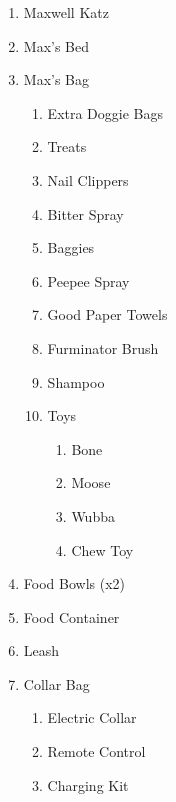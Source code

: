 \documentclass[pdftex,12pt]{article}
\begin{document}
\begin{enumerate}\label{itm:included_items}
    \item Maxwell Katz
    \item Max's Bed
    \item Max's Bag
        \begin{enumerate}
            \item Extra Doggie Bags
            \item Treats
            \item Nail Clippers
            \item Bitter Spray
            \item Baggies
            \item Peepee Spray
            \item Good Paper Towels
            \item Furminator Brush
            \item Shampoo
            \item Toys
                \begin{enumerate}
                    \item Bone
                    \item Moose
                    \item Wubba
                    \item Chew Toy
                \end{enumerate}
        \end{enumerate}
    \item Food Bowls (x2)
    \item Food Container
    \item Leash
    \item Collar Bag
        \begin{enumerate}
            \item Electric Collar
            \item Remote Control
            \item Charging Kit
        \end{enumerate}
\end{enumerate}
\end{document}
